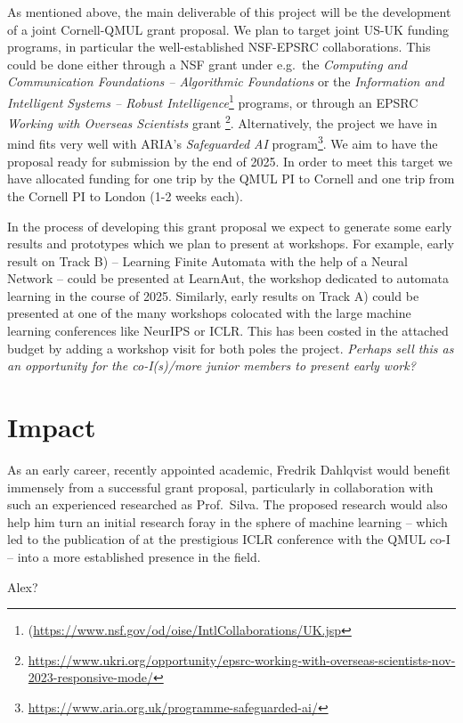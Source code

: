 \documentclass[10pt,a4paper]{article}
\begin{document}
		As mentioned above, the main deliverable of this project will be the development of a joint Cornell-QMUL grant proposal. We plan to target joint US-UK funding programs, in particular the well-established NSF-EPSRC collaborations. This could be done either through a NSF grant under e.g.\ the \emph{Computing and Communication Foundations -- Algorithmic Foundations} or the \emph{Information and Intelligent Systems -- Robust Intelligence}\footnote{(\url{https://www.nsf.gov/od/oise/IntlCollaborations/UK.jsp}} programs, or through an EPSRC \emph{Working with Overseas Scientists} grant \footnote{\url{https://www.ukri.org/opportunity/epsrc-working-with-overseas-scientists-nov-2023-responsive-mode/}}. Alternatively, the project we have in mind fits very well with ARIA's \emph{Safeguarded AI} program\footnote{\url{https://www.aria.org.uk/programme-safeguarded-ai/}}. We aim to have the proposal ready for submission by the end of 2025. In order to meet this target we have allocated funding for one trip by the QMUL PI to Cornell and one trip from the Cornell PI to London (1-2 weeks each).
		
		In the process of developing this grant proposal we expect to generate some early results and prototypes which we plan to present at workshops. For example, early result on Track B) -- Learning Finite Automata with the help of a Neural Network -- could be presented at LearnAut, the workshop dedicated to automata learning in the course of 2025.  Similarly, early results on Track A) could be presented at one of the many workshops colocated with the large machine learning conferences like NeurIPS or ICLR. This has been costed in the attached budget by adding a workshop visit for both poles the project. \emph{Perhaps sell this as an opportunity for the co-I(s)/more junior members to present early work?}
	
		
	\section{Impact}
		As an early career, recently appointed academic, Fredrik Dahlqvist would benefit immensely from a successful grant proposal, particularly in collaboration with such an experienced researched as Prof.\ Silva. The proposed research would also help him turn an initial research foray in the sphere of machine learning -- which led to the publication of \cite{pruning} at the prestigious ICLR conference with the QMUL co-I -- into a more established presence in the field.
		
		Alex?
		
\end{document}
